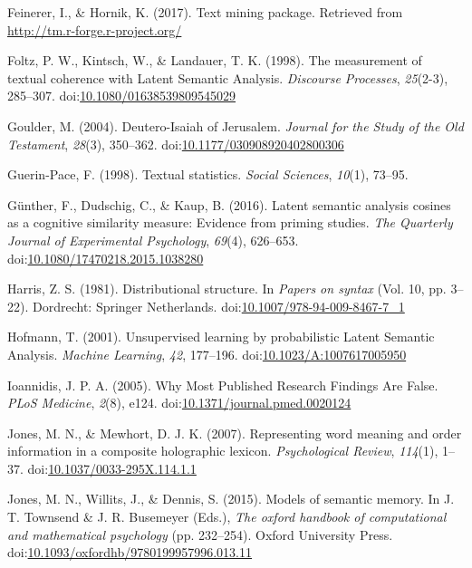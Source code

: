 \documentclass[english,man]{apa6}
\theoremstyle{definition}
\theoremstyle{definition}
\theoremstyle{definition}
\theoremstyle{remark}
\begin{document}
\hypertarget{ref-Feinerer2017}{}
Feinerer, I., \& Hornik, K. (2017). Text mining package. Retrieved from
\url{http://tm.r-forge.r-project.org/}

\hypertarget{ref-Foltz1998}{}
Foltz, P. W., Kintsch, W., \& Landauer, T. K. (1998). The measurement of
textual coherence with Latent Semantic Analysis. \emph{Discourse
Processes}, \emph{25}(2-3), 285--307.
doi:\href{https://doi.org/10.1080/01638539809545029}{10.1080/01638539809545029}

\hypertarget{ref-Goulder2004}{}
Goulder, M. (2004). Deutero-Isaiah of Jerusalem. \emph{Journal for the
Study of the Old Testament}, \emph{28}(3), 350--362.
doi:\href{https://doi.org/10.1177/030908920402800306}{10.1177/030908920402800306}

\hypertarget{ref-Pace1998}{}
Guerin-Pace, F. (1998). Textual statistics. \emph{Social Sciences},
\emph{10}(1), 73--95.

\hypertarget{ref-Gunther2016}{}
Günther, F., Dudschig, C., \& Kaup, B. (2016). Latent semantic analysis
cosines as a cognitive similarity measure: Evidence from priming
studies. \emph{The Quarterly Journal of Experimental Psychology},
\emph{69}(4), 626--653.
doi:\href{https://doi.org/10.1080/17470218.2015.1038280}{10.1080/17470218.2015.1038280}

\hypertarget{ref-Harris1954}{}
Harris, Z. S. (1981). Distributional structure. In \emph{Papers on
syntax} (Vol. 10, pp. 3--22). Dordrecht: Springer Netherlands.
doi:\href{https://doi.org/10.1007/978-94-009-8467-7_1}{10.1007/978-94-009-8467-7\_1}

\hypertarget{ref-Hofmann2001}{}
Hofmann, T. (2001). Unsupervised learning by probabilistic Latent
Semantic Analysis. \emph{Machine Learning}, \emph{42}, 177--196.
doi:\href{https://doi.org/10.1023/A:1007617005950}{10.1023/A:1007617005950}

\hypertarget{ref-Ioannidis2005}{}
Ioannidis, J. P. A. (2005). Why Most Published Research Findings Are
False. \emph{PLoS Medicine}, \emph{2}(8), e124.
doi:\href{https://doi.org/10.1371/journal.pmed.0020124}{10.1371/journal.pmed.0020124}

\hypertarget{ref-Jones2007}{}
Jones, M. N., \& Mewhort, D. J. K. (2007). Representing word meaning and
order information in a composite holographic lexicon.
\emph{Psychological Review}, \emph{114}(1), 1--37.
doi:\href{https://doi.org/10.1037/0033-295X.114.1.1}{10.1037/0033-295X.114.1.1}

\hypertarget{ref-Jones2015}{}
Jones, M. N., Willits, J., \& Dennis, S. (2015). Models of semantic
memory. In J. T. Townsend \& J. R. Busemeyer (Eds.), \emph{The oxford
handbook of computational and mathematical psychology} (pp. 232--254).
Oxford University Press.
doi:\href{https://doi.org/10.1093/oxfordhb/9780199957996.013.11}{10.1093/oxfordhb/9780199957996.013.11}
\end{document}
